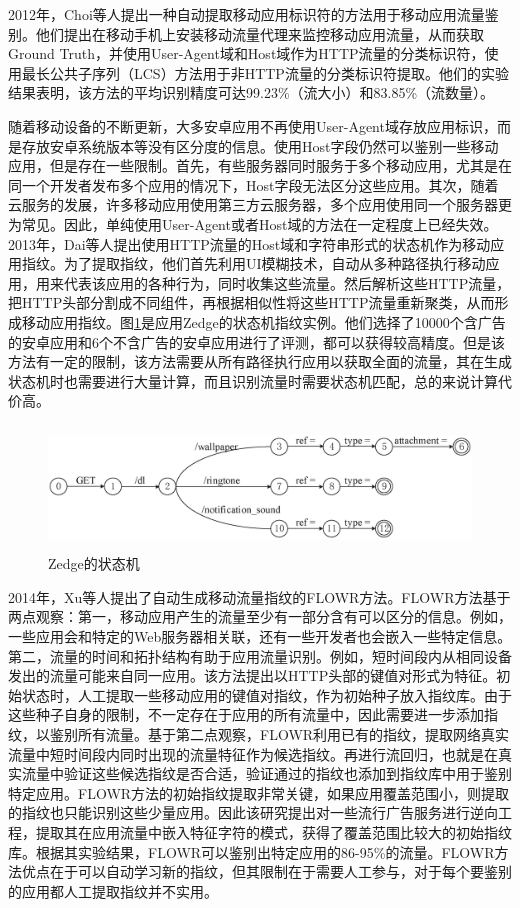 2012年，Choi等人提出一种自动提取移动应用标识符的方法用于移动应用流量鉴别\supercite{choi2012automated}。他们提出在移动手机上安装移动流量代理来监控移动应用流量，从而获取Ground Truth，并使用User-Agent域和Host域作为HTTP流量的分类标识符，使用最长公共子序列（LCS）方法用于非HTTP流量的分类标识符提取。他们的实验结果表明，该方法的平均识别精度可达99.23\%（流大小）和83.85\%（流数量）。

随着移动设备的不断更新，大多安卓应用不再使用User-Agent域存放应用标识，而是存放安卓系统版本等没有区分度的信息。使用Host字段仍然可以鉴别一些移动应用，但是存在一些限制。首先，有些服务器同时服务于多个移动应用，尤其是在同一个开发者发布多个应用的情况下，Host字段无法区分这些应用。其次，随着云服务的发展，许多移动应用使用第三方云服务器，多个应用使用同一个服务器更为常见。因此，单纯使用User-Agent或者Host域的方法在一定程度上已经失效。2013年，Dai等人提出使用HTTP流量的Host域和字符串形式的状态机作为移动应用指纹\supercite{dai2013networkprofiler}。为了提取指纹，他们首先利用UI模糊技术，自动从多种路径执行移动应用，用来代表该应用的各种行为，同时收集这些流量。然后解析这些HTTP流量，把HTTP头部分割成不同组件，再根据相似性将这些HTTP流量重新聚类，从而形成移动应用指纹。图\ref{fig:23}是应用Zedge的状态机指纹实例。他们选择了10000个含广告的安卓应用和6个不含广告的安卓应用进行了评测，都可以获得较高精度。但是该方法有一定的限制，该方法需要从所有路径执行应用以获取全面的流量，其在生成状态机时也需要进行大量计算，而且识别流量时需要状态机匹配，总的来说计算代价高。

\begin{figure}[thb]
\centering
\includegraphics[height=1.3in]{./figures/2/2-3}
\caption{Zedge的状态机}
\label{fig:23}
\end{figure}

2014年，Xu等人提出了自动生成移动流量指纹的FLOWR方法\supercite{xu2014flowr,xu2015automatic}。FLOWR方法基于两点观察：第一，移动应用产生的流量至少有一部分含有可以区分的信息。例如，一些应用会和特定的Web服务器相关联，还有一些开发者也会嵌入一些特定信息。第二，流量的时间和拓扑结构有助于应用流量识别。例如，短时间段内从相同设备发出的流量可能来自同一应用。该方法提出以HTTP头部的键值对形式为特征。初始状态时，人工提取一些移动应用的键值对指纹，作为初始种子放入指纹库。由于这些种子自身的限制，不一定存在于应用的所有流量中，因此需要进一步添加指纹，以鉴别所有流量。基于第二点观察，FLOWR利用已有的指纹，提取网络真实流量中短时间段内同时出现的流量特征作为候选指纹。再进行流回归，也就是在真实流量中验证这些候选指纹是否合适，验证通过的指纹也添加到指纹库中用于鉴别特定应用。FLOWR方法的初始指纹提取非常关键，如果应用覆盖范围小，则提取的指纹也只能识别这些少量应用。因此该研究提出对一些流行广告服务进行逆向工程，提取其在应用流量中嵌入特征字符的模式，获得了覆盖范围比较大的初始指纹库。根据其实验结果，FLOWR可以鉴别出特定应用的86-95\%的流量。FLOWR方法优点在于可以自动学习新的指纹，但其限制在于需要人工参与，对于每个要鉴别的应用都人工提取指纹并不实用。

